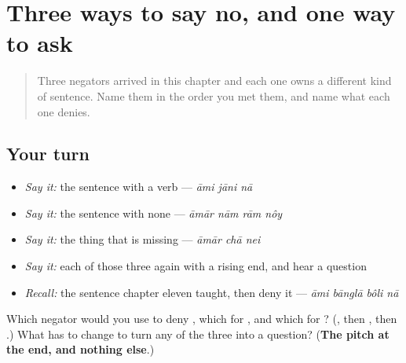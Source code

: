 \section[\texorpdfstring{\bn{না} · \bn{নয়} · \bn{নেই} (nā · nôy · nei)}{না · নয় · নেই (nā · nôy · nei)}]{Three ways to say no, and one way to ask}

\label{lesson:BN-R16-three-noes}



\begin{quote}
Three negators arrived in this chapter and each one owns a different kind of sentence. Name them in the order you met them, and name what each one denies.
\end{quote}

\subsection*{Your turn}
\begin{itemize}
\raggedright
  \item \emph{Say it:} the sentence with a verb — \emph{āmi jāni nā}
  \item \emph{Say it:} the sentence with none — \emph{āmār nām rām nôy}
  \item \emph{Say it:} the thing that is missing — \emph{āmār chā nei}
  \item \emph{Say it:} each of those three again with a rising end, and hear a question
  \item \emph{Recall:} the sentence chapter eleven taught, then deny it — \emph{āmi bānglā bôli nā}
\end{itemize}

\begin{tcolorbox}[breakable,colback=teal!4,colframe=teal!35!black,title={Before you move on}]
Which negator would you use to deny \textbf{  }, which for \textbf{ }, and which for \textbf{  }? (\textbf{}, then \textbf{}, then \textbf{}.) What has to change to turn any of the three into a question? (\textbf{The pitch at the end, and nothing else}.)
\end{tcolorbox}
